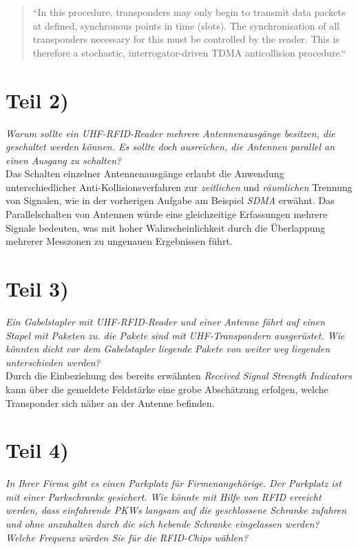 \blockquote[{\cite[201]{Fin10}}]{
    ``In this procedure, transponders may only begin to transmit data
    packets at defined, synchronous points in time (slots). The synchronisation of all transponders
    necessary for this must be controlled by the reader. This is therefore a stochastic, interrogator-driven
    TDMA anticollision procedure.``
}

\section{Teil 2)}

\textit{Warum sollte ein UHF-RFID-Reader mehrere Antennenausgänge besitzen, die geschaltet werden können. Es sollte doch ausreichen, die
Antennen parallel an einen Ausgang zu schalten?}\\

\noindent
Das Schalten einzelner Antennenausgänge erlaubt die Anwendung unterschiedlicher Anti-Kollisionsverfahren zur \textit{zeitlichen} und \textit{räumlichen} Trennung von Signalen, wie in der vorherigen Aufgabe am Beispiel \textit{SDMA} erwähnt.
Das Parallelschalten von Antennen würde eine gleichzeitige Erfassungen mehrere Signale bedeuten, was mit hoher Wahrscheinlichkeit durch die Überlappung mehrerer Messzonen zu ungenauen Ergebnissen führt.

\section{Teil 3)}

\textit{Ein Gabelstapler mit UHF-RFID-Reader und einer Antenne fährt auf
einen Stapel mit Paketen zu. die Pakete sind mit UHF-Transpondern
ausgerüstet. Wie könnten dicht vor dem Gabelstapler liegende Pakete
von weiter weg liegenden unterschieden werden?}\\

\noindent
Durch die Einbeziehung des bereits erwähnten \textit{Received Signal Strength Indicators} kann über die gemeldete Feldstärke eine grobe Abschätzung erfolgen, welche Transponder sich näher an der Antenne befinden.

\section{Teil 4)}

\textit{In Ihrer Firma gibt es einen Parkplatz für Firmenangehörige. Der
Parkplatz ist mit einer Parkschranke gesichert. Wie könnte mit
Hilfe von RFID erreicht werden, dass einfahrende PKWs langsam
auf die geschlossene Schranke zufahren und ohne anzuhalten durch
die sich hebende Schranke eingelassen werden?\\Welche Frequenz würden Sie für die RFID-Chips wählen?}\\

